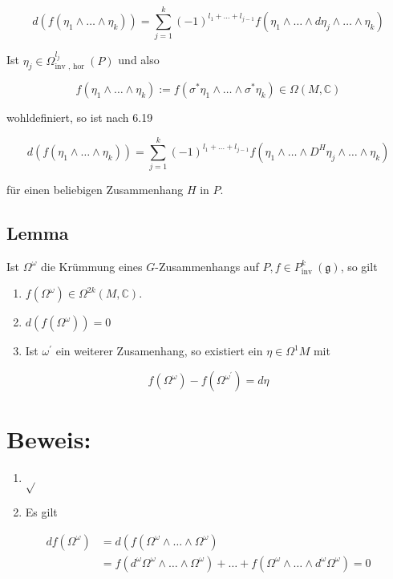 \documentclass[10pt, letterpaper]{article}
\begin{document}
$$
d\left(f\left(\eta_{1} \wedge \ldots \wedge \eta_{k}\right)\right)=\sum_{j=1}^{k}(-1)^{l_{1}+\ldots+l_{j-1}} f\left(\eta_{1} \wedge \ldots \wedge d \eta_{j} \wedge \ldots \wedge \eta_{k}\right)
$$

Ist $\eta_{j} \in \Omega_{\text {inv }, \text { hor }}^{l_{j}}(P)$ und also

$$
f\left(\eta_{1} \wedge \ldots \wedge \eta_{k}\right):=f\left(\sigma^{*} \eta_{1} \wedge \ldots \wedge \sigma^{*} \eta_{k}\right) \in \Omega(M, \mathbb{C})
$$

wohldefiniert, so ist nach 6.19

$$
d\left(f\left(\eta_{1} \wedge \ldots \wedge \eta_{k}\right)\right)=\sum_{j=1}^{k}(-1)^{l_{1}+\ldots+l_{j-1}} f\left(\eta_{1} \wedge \ldots \wedge D^{H} \eta_{j} \wedge \ldots \wedge \eta_{k}\right)
$$

für einen beliebigen Zusammenhang $H$ in $P$.

\subsection*{Lemma}
Ist $\Omega^{\omega}$ die Krümmung eines $G$-Zusammenhangs auf $P, f \in P_{\text {inv }}^{k}(\mathfrak{g})$, so gilt

\begin{enumerate}
  \item $f\left(\Omega^{\omega}\right) \in \Omega^{2 k}(M, \mathbb{C})$.
  \item $d\left(f\left(\Omega^{\omega}\right)\right)=0$
  \item Ist $\omega^{\prime}$ ein weiterer Zusamenhang, so existiert ein $\eta \in \Omega^{1} M$ mit
\end{enumerate}

$$
f\left(\Omega^{\omega}\right)-f\left(\Omega^{\omega^{\prime}}\right)=d \eta
$$

\section*{Beweis:}
\begin{enumerate}
  \item $\sqrt{ }$
  \item Es gilt
\end{enumerate}

$$
\begin{aligned}
d f\left(\Omega^{\omega}\right) & =d\left(f\left(\Omega^{\omega} \wedge \ldots \wedge \Omega^{\omega}\right)\right. \\
& =f\left(d^{\omega} \Omega^{\omega} \wedge \ldots \wedge \Omega^{\omega}\right)+\ldots+f\left(\Omega^{\omega} \wedge \ldots \wedge d^{\omega} \Omega^{\omega}\right)=0
\end{aligned}
$$
\end{document}
